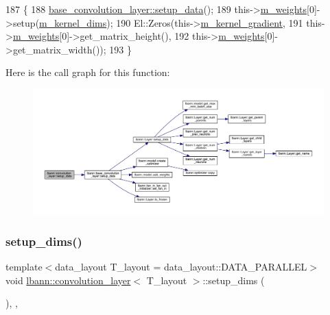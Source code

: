 \begin{DoxyCode}
187                              \{
188     \hyperlink{classlbann_1_1base__convolution__layer_a9f850c1bdf4ae3cd986411d3cb3a524c}{base\_convolution\_layer::setup\_data}();
189     this->\hyperlink{classlbann_1_1Layer_a7954e30fbf9100a6ba4b56d02767a469}{m\_weights}[0]->setup(\hyperlink{classlbann_1_1base__convolution__layer_a283edb6a476f975e713d0b4235ac658f}{m\_kernel\_dims});
190     El::Zeros(this->\hyperlink{classlbann_1_1base__convolution__layer_a4129f11df61ed92bcad24ae855d7bd11}{m\_kernel\_gradient},
191               this->\hyperlink{classlbann_1_1Layer_a7954e30fbf9100a6ba4b56d02767a469}{m\_weights}[0]->get\_matrix\_height(),
192               this->\hyperlink{classlbann_1_1Layer_a7954e30fbf9100a6ba4b56d02767a469}{m\_weights}[0]->get\_matrix\_width());
193   \}
\end{DoxyCode}
Here is the call graph for this function\+:\nopagebreak
\begin{figure}[H]
\begin{center}
\leavevmode
\includegraphics[width=350pt]{classlbann_1_1convolution__layer_ab20636b44d2b17abdb5424df54cb9c6d_cgraph}
\end{center}
\end{figure}
\mbox{\label{classlbann_1_1convolution__layer_adbb45d032ad79c793a159b7ee79eef14}} 
\subsubsection{\texorpdfstring{setup\+\_\+dims()}{setup\_dims()}}
{\footnotesize\ttfamily template$<$data\+\_\+layout T\+\_\+layout = data\+\_\+layout\+::\+D\+A\+T\+A\+\_\+\+P\+A\+R\+A\+L\+L\+EL$>$ \\
void \hyperlink{classlbann_1_1convolution__layer}{lbann\+::convolution\+\_\+layer}$<$ T\+\_\+layout $>$\+::setup\+\_\+dims (\begin{DoxyParamCaption}{ }\end{DoxyParamCaption})\hspace{0.3cm}{\ttfamily [inline]}, {\ttfamily [override]}, {\ttfamily [virtual]}}


